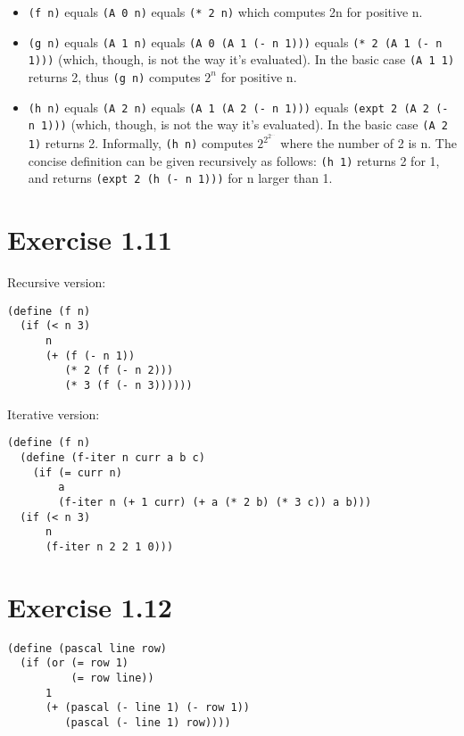 \documentclass[../main.tex]{subfiles}
\begin{document}
\begin{itemize}
\item \lstinline{(f n)} equals \lstinline{(A 0 n)} equals \lstinline{(* 2 n)} which computes 2n for positive n.
\item \lstinline{(g n)} equals \lstinline{(A 1 n)} equals \lstinline{(A 0 (A 1 (- n 1)))} equals \lstinline{(* 2 (A 1 (- n 1)))} (which, though, is not the way it's evaluated). In the basic case \lstinline{(A 1 1)} returns 2, thus \lstinline{(g n)} computes $2^n$ for positive n.
\item \lstinline{(h n)} equals \lstinline{(A 2 n)} equals \lstinline{(A 1 (A 2 (- n 1)))} equals \lstinline{(expt 2 (A 2 (- n 1)))} (which, though, is not the way it's evaluated). In the basic case \lstinline{(A 2 1)} returns 2. Informally, \lstinline{(h n)} computes $2^{2^{2^{...}}}$ where the number of 2 is n. The concise definition can be given recursively as follows: \lstinline{(h 1)} returns 2 for 1, and returns \lstinline{(expt 2 (h (- n 1)))} for n larger than 1.
\end{itemize}

\section{Exercise 1.11}

Recursive version:

\begin{lstlisting}
(define (f n)
  (if (< n 3)
      n
      (+ (f (- n 1))
         (* 2 (f (- n 2)))
         (* 3 (f (- n 3))))))
\end{lstlisting}

Iterative version:

\begin{lstlisting}
(define (f n)
  (define (f-iter n curr a b c)
    (if (= curr n)
        a
        (f-iter n (+ 1 curr) (+ a (* 2 b) (* 3 c)) a b)))
  (if (< n 3)
      n
      (f-iter n 2 2 1 0)))
\end{lstlisting}

\section{Exercise 1.12}

\begin{lstlisting}
(define (pascal line row)
  (if (or (= row 1)
          (= row line))
      1
      (+ (pascal (- line 1) (- row 1))
         (pascal (- line 1) row))))
\end{lstlisting}
\end{document}
